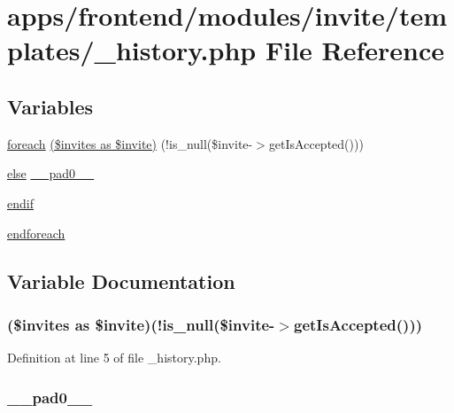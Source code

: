 \hypertarget{__history_8php}{\section{apps/frontend/modules/invite/templates/\-\_\-history.php File Reference}
\label{__history_8php}
}
\subsection*{Variables}
\begin{DoxyCompactItemize}
\item 
\hyperlink{presse_2modules_2news_2templates_2index_success_8php_abc56db52b2e9a59bcd5c9e45ac5cb332}{foreach} \hyperlink{__history_8php_a9da59b5854a76b91513cc9d9302e724e}{(\$invites as \$invite)} (!is\-\_\-null(\$invite-\/$>$get\-Is\-Accepted()))
\item 
\hyperlink{live_2modules_2team_2templates_2management_success_8php_a0544c3fe466e421738dae463968b70ba}{else} \hyperlink{__history_8php_a8e01dcc96c43199448ee66f7c2ae8ea6}{\-\_\-\-\_\-pad0\-\_\-\-\_\-}
\item 
\hyperlink{__history_8php_a82cd33ca97ff99f2fcc5e9c81d65251b}{endif}
\item 
\hyperlink{__history_8php_a672d9707ef91db026c210f98cc601123}{endforeach}
\end{DoxyCompactItemize}


\subsection{Variable Documentation}
\hypertarget{__history_8php_a9da59b5854a76b91513cc9d9302e724e}{
\subsubsection[{(\$invites as \$invite)}]{ (\$invites as \$invite)(!is\-\_\-null(\$invite-\/$>$get\-Is\-Accepted()))}}\label{__history_8php_a9da59b5854a76b91513cc9d9302e724e}


Definition at line 5 of file \-\_\-history.\-php.

\hypertarget{__history_8php_a8e01dcc96c43199448ee66f7c2ae8ea6}{
\subsubsection[{\-\_\-\-\_\-pad0\-\_\-\-\_\-}]{ \-\_\-\-\_\-pad0\-\_\-\-\_\-}}\label{__history_8php_a8e01dcc96c43199448ee66f7c2ae8ea6}


